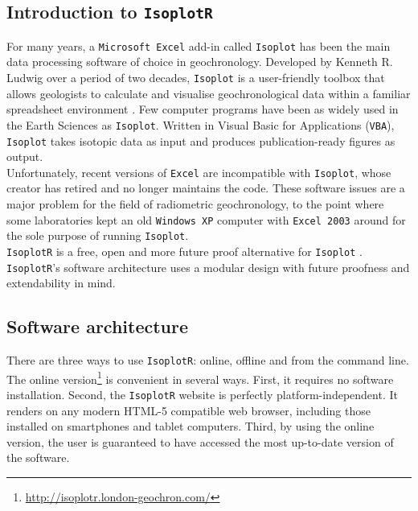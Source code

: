 \begin{refsection}
\chapter{Introduction to \texttt{IsoplotR}}
\label{ch:intro2IsoplotR}
  
For many years, a \texttt{Microsoft Excel} add-in called
\texttt{Isoplot} has been the main data processing software of choice
in geochronology. Developed by Kenneth R. Ludwig over a period of two
decades, \texttt{Isoplot} is a user-friendly toolbox that allows
geologists to calculate and visualise geochronological data within a
familiar spreadsheet environment \citep{ludwig1988, ludwig1999,
  ludwig2003, ludwig2012}.  Few computer programs have been as widely
used in the Earth Sciences as \texttt{Isoplot}. Written in Visual
Basic for Applications (\texttt{VBA}), \texttt{Isoplot} takes isotopic
data as input and produces publication-ready figures as output.\\

Unfortunately, recent versions of \texttt{Excel} are incompatible with
\texttt{Isoplot}, whose creator has retired and no longer maintains
the code. These software issues are a major problem for the field of
radiometric geochronology, to the point where some laboratories kept
an old \texttt{Windows~XP} computer with \texttt{Excel~2003} around
for the sole purpose of running \texttt{Isoplot}.\\

\texttt{IsoplotR} is a free, open and more future proof alternative
for \texttt{Isoplot} \citep{vermeesch2018c}.  \texttt{IsoplotR}'s
software architecture uses a modular design with future proofness and
extendability in mind.

\section{Software architecture}
\label{sec:architecture}

There are three ways to use \texttt{IsoplotR}: online, offline and
from the command line.\\

The online
version\footnote{\url{http://isoplotr.london-geochron.com/}} is
convenient in several ways. First, it requires no software
installation. Second, the \texttt{IsoplotR} website is perfectly
platform-independent. It renders on any modern HTML-5 compatible web
browser, including those installed on smartphones and tablet
computers. Third, by using the online version, the user is guaranteed
to have accessed the most up-to-date version of the software.\\


\end{refsection}

